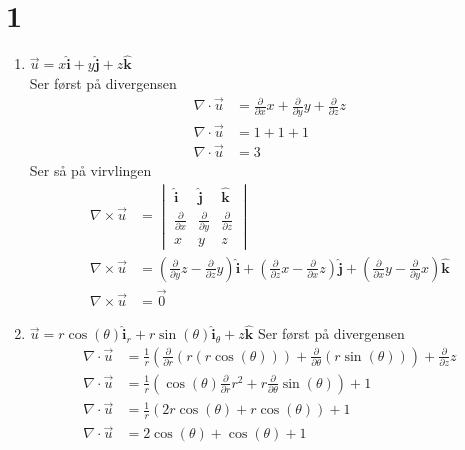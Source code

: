 \documentclass[a4paper,10pt,norsk]{article}
\newcommand{\uvec}[1]{\boldsymbol{\hat{\textbf{#1}}}}
\begin{document}
\section*{1}
	\begin{enumerate}[i]
		\item  $\vec{u}  = x \uvec{i} + y \uvec{j} + z \uvec{k}$\\
			Ser først på divergensen
			\begin{align*}
				\nabla \cdot \vec{u} &= \frac{\partial }{\partial x} x + \frac{\partial }{\partial y} y + \frac{\partial }{\partial z} z\\
				\nabla \cdot \vec{u} &= 1 + 1 +1\\
				\nabla \cdot \vec{u} &= 3
			\end{align*}
			Ser så på virvlingen
			\begin{align*}
				\nabla \times \vec{u}  &= 
				\begin{vmatrix}
					\uvec{i} & \uvec{j} & \uvec{k} \\
					\frac{\partial }{\partial x} & \frac{\partial }{\partial y} & \frac{\partial }{\partial z} \\
					x & y & z
				\end{vmatrix}\\
				\nabla \times \vec{u}  &= \left( \frac{\partial }{\partial y} z - \frac{\partial }{\partial z} y \right) \uvec{i} + \left( \frac{\partial }{\partial z} x - \frac{\partial }{\partial x} z \right) \uvec{j} + \left( \frac{\partial }{\partial x} y - \frac{\partial }{\partial y} x \right) \uvec{k}\\
				\nabla \times \vec{u}  &= \vec{0} 
			\end{align*}
		\item $\vec{u} = r \cos(\theta) \uvec{i}_r + r \sin(\theta) \uvec{i}_{\theta} + z \uvec{k}$
			Ser først på divergensen
			\begin{align*}
				\nabla \cdot \vec{u}  &= \frac{1}{r} \left( \frac{\partial }{\partial r} \left( r \left( r \cos(\theta)  \right)  \right) + \frac{\partial }{\partial \theta} \left( r \sin(\theta)  \right)  \right) + \frac{\partial }{\partial z} z\\
				\nabla \cdot \vec{u}  &= \frac{1}{r} \left( \cos(\theta) \frac{\partial }{\partial r} r^2 + r \frac{\partial }{\partial \theta} \sin(\theta)  \right) + 1\\
				\nabla \cdot \vec{u}  &= \frac{1}{r} \left( 2r \cos(\theta)  + r \cos(\theta)  \right) + 1\\
				\nabla \cdot \vec{u}  &= 2 \cos(\theta)  + \cos(\theta)  +1\\

\end{align*}
\end{enumerate}
\end{document}
